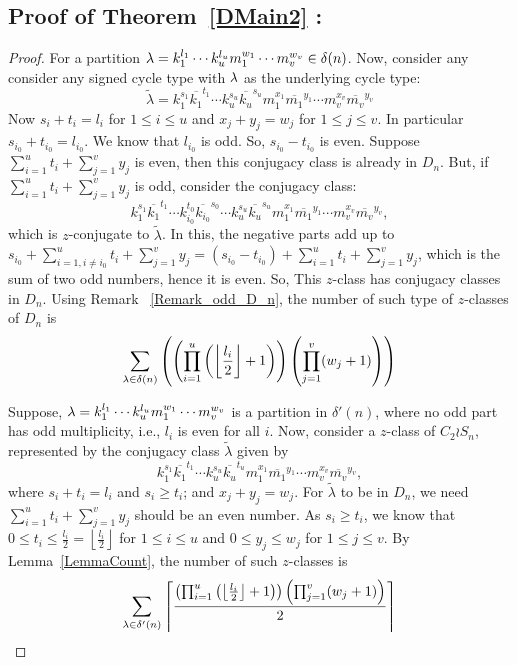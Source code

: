 \documentclass[12pt,twoside,reqno]{amsart}
\theoremstyle{definition}
\numberwithin{equation}{section}
\newcommand{\lbd}{\lambda}
\begin{document}
\subsection{Proof of Theorem~\ref{DMain2} :}
\begin{proof}
    For a partition ${\bf \lambda} = k_1^{l_1}\cdots k_u^{l_u}m_1^{w_1}\cdots m_v^{w_v} \in \delta(n)$. Now, consider any consider any signed cycle type with ${\bf \lbd}$ as the underlying cycle type:
    $$\tilde{\lbd} = k_1^{s_1}\overline{k_1}^{t_1}\cdots k_u^{s_u}\overline{k_u}^{s_u}m_1^{x_1}\overline{m_1}^{y_1}\cdots m_v^{x_v}\overline{m_v}^{y_v}$$
    Now $s_i + t_i = l_i$ for $1 \leq i \leq u$ and $x_j + y_j = w_j$ for $1 \leq j \leq v$. In particular $s_{i_0} + t_{i_0} = l_{i_0}$. We know that $l_{i_0}$ is odd. So, $s_{i_0} - t_{i_0}$ is even. Suppose $\sum_{i=1}^u t_i + \sum_{j=1}^vy_j$ is even, then this conjugacy class is already in $D_n$. But, if  $\sum_{i=1}^u t_i + \sum_{j=1}^vy_j$ is odd, consider the conjugacy class: $$k_1^{s_1}\overline{k_1}^{t_1}\cdots k_{i_0}^{t_0}\overline{k_{i_0}}^{s_0}\cdots k_u^{s_u}\overline{k_u}^{s_u}m_1^{x_1}\overline{m_1}^{y_1}\cdots m_v^{x_v}\overline{m_v}^{y_v},$$ which is $z$-conjugate to $\tilde{\lbd}$. In this, the negative parts add up to $\displaystyle s_{i_0} + \sum_{i=1, i\neq i_0}^u t_i + \sum_{j=1}^v y_j =(s_{i_0} - t_{i_0})  + \sum_{i=1}^u t_i + \sum_{j=1}^vy_j $, which is the sum of two odd numbers, hence it is even. So, This $z$-class has conjugacy classes in $D_n$. Using Remark ~\ref{Remark_odd_D_n}, the number of such type of $z$-classes of $D_n$ is \begin{equation}\label{DnZclPt1}\sum_{{\bf \lambda} \in \delta(n) }\left( \left(\prod_{i=1}^u \left(\left\lfloor \frac{l_i}{2}\right\rfloor + 1\right)\right)\left(\prod_{j=1}^v (w_j+1)\right)\right) \end{equation}

    Suppose, ${\bf \lbd} =k_1^{l_1}\cdots k_u^{l_u}m_1^{w_1}\cdots m_v^{w_v} $ is a partition in $\delta'(n)$, where no odd part has odd multiplicity, i.e., $l_i$ is even for all $i$. Now, consider a $z$-class of $C_2 \wr S_n$, represented by the conjugacy class $\tilde{\lbd}$ given by $$k_1^{s_1}\overline{k_1}^{t_1}\cdots k_u^{s_u}\overline{k_u}^{t_u}m_1^{x_1}\overline{m_1}^{y_1}\cdots m_v^{x_v}\overline{m_v}^{y_v}, $$
 where $s_i + t_i =  l_i$ and $s_i \geq t_i$; and $x_j + y_j = w_j$. For $\tilde{\lbd}$ to be in $D_n$, we need $\sum_{i=1}^ut_i + \sum_{j=1}^v y_j $  should be an even number. As $s_i \geq t_i$, we know that $0 \leq t_i \leq \frac{l_i}{2} =\left\lfloor \frac{l_i}{2}\right\rfloor$ for $1 \leq i \leq u$ and $0 \leq y_j \leq w_j$  for $1\leq j \leq v$. 
 By Lemma~\ref{LemmaCount}, the number of such $z$-classes is 
 \begin{equation}\label{DnZclPt2} \sum_{{\bf \lambda} \in \delta^\prime(n) }\left\lceil \frac{\left(\prod_{i=1}^u \left(\left\lfloor \frac{l_i}{2}\right\rfloor + 1\right)\right)\left(\prod_{j=1}^v (w_j+1)\right)}{2}\right\rceil
 \end{equation}


\end{proof}
\end{document}
